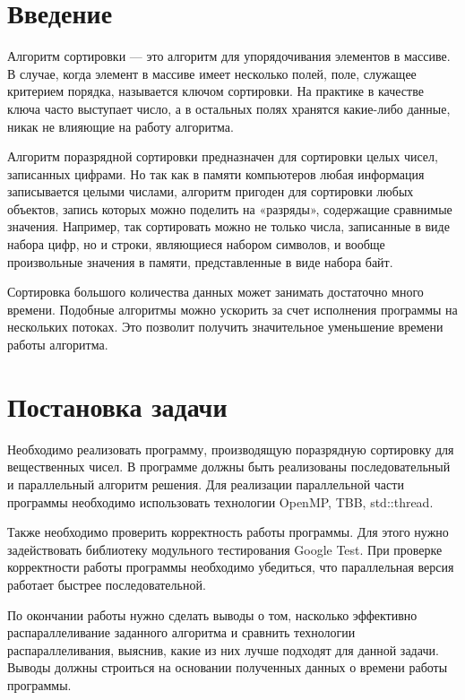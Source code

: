 \documentclass{report}
\begin{document}
\setcounter{page}{2}

\tableofcontents
\newpage

\section*{Введение}
\par Алгоритм сортировки — это алгоритм для упорядочивания элементов в массиве. В случае, когда элемент в массиве имеет несколько полей, поле, служащее критерием порядка, называется ключом сортировки. На практике в качестве ключа часто выступает число, а в остальных полях хранятся какие-либо данные, никак не влияющие на работу алгоритма.
\par Алгоритм поразрядной сортировки предназначен для сортировки целых чисел, записанных цифрами. Но так как в памяти компьютеров любая информация записывается целыми числами, алгоритм пригоден для сортировки любых объектов, запись которых можно поделить на «разряды», содержащие сравнимые значения. Например, так сортировать можно не только числа, записанные в виде набора цифр, но и строки, являющиеся набором символов, и вообще произвольные значения в памяти, представленные в виде набора байт.
\par Сортировка большого количества данных может занимать достаточно много времени. Подобные алгоритмы можно ускорить за счет исполнения программы на нескольких потоках. Это позволит получить значительное уменьшение времени работы алгоритма. 
\newpage

\section*{Постановка задачи}
\par Необходимо реализовать программу, производящую поразрядную сортировку для вещественных чисел. В программе должны быть реализованы последовательный и параллельный алгоритм решения. Для реализации параллельной части программы необходимо использовать технологии OpenMP, TBB, std::thread.
\par Также необходимо проверить корректность работы программы. Для этого нужно задействовать библиотеку модульного тестирования Google Test. При проверке корректности работы программы необходимо убедиться, что параллельная версия работает быстрее последовательной.
\par По окончании работы нужно сделать выводы о том, насколько эффективно распараллеливание заданного алгоритма и сравнить технологии распараллеливания, выяснив, какие из них лучше подходят для данной задачи. Выводы должны строиться на основании полученных данных о времени работы программы.
\newpage
\end{document}
